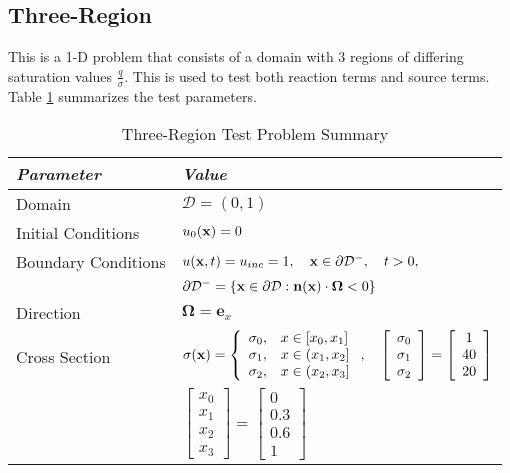 \subsection{Three-Region}\label{sec:three_region}
This is a 1-D problem that consists of a domain with 3 regions of differing
saturation values $\frac{q}{\sigma}$. This is used to test both reaction
terms and source terms.
Table \ref{tab:three_region} summarizes the test parameters.

\begin{table}[h]\caption{Three-Region Test Problem Summary}
\label{tab:three_region}
\centering
\begin{tabular}{l l}\toprule
\emph{Parameter} & \emph{Value}\\\midrule
Domain & $\mathcal{D} = (0,1)$\\
Initial Conditions & $u_0(\mathbf{x})=0$\\
Boundary Conditions & $u(\mathbf{x},t)=u_{inc}=1,\quad \mathbf{x}\in\partial\mathcal{D}^-,\quad t>0,$\\
   & $\partial\mathcal{D}^-=\{\mathbf{x}\in\partial\mathcal{D}:\mathbf{n}(\mathbf{x})
     \cdot\mathbf{\Omega}<0\}$\\
Direction & $\mathbf{\Omega} = \mathbf{e}_x$\\
Cross Section & $\sigma(\mathbf{x})=\left\{\begin{array}{c l}
   \sigma_0, & x\in[x_0,x_1]\\
   \sigma_1, & x\in(x_1,x_2]\\
   \sigma_2, & x\in(x_2,x_3]
   \end{array}\right.,\quad
   \left[\begin{array}{c}\sigma_0\\\sigma_1\\\sigma_2\end{array}\right] =
      \left[\begin{array}{c}1\\40\\20\end{array}\right]$\\
   & $\left[\begin{array}{c}x_0\\x_1\\x_2\\x_3\end{array}\right] =
      \left[\begin{array}{c}0\\0.3\\0.6\\1\end{array}\right]$\\

\end{tabular}
\end{table}

